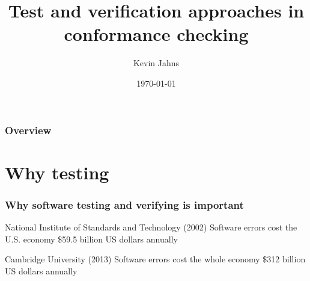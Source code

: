 \documentclass{beamer}
\title[MBT]{Test and verification approaches in conformance checking} %
\author{Kevin Jahns} %
\institute[] %
{
RWTH Aachen University \\ %
\medskip
\textit{kevin.jahns@rwth-aachen.de} %
}
\date{\today} %
\begin{document}
\begin{frame}
\titlepage %
\end{frame}

\begin{frame}
\frametitle{Overview} %
\tableofcontents %
\end{frame}


\section{Why testing}
\begin{frame}
\frametitle{Why software testing and verifying is important}
\begin{block}{National Institute of Standards and Technology (2002)}
Software errors cost the U.S. economy \$59.5 billion US dollars
annually \cite{nist}
\end{block}
\begin{block}{Cambridge University (2013)}
Software errors cost the whole economy \$312 billion US dollars
annually \cite{cambridge_errors}
\end{block}
\end{frame}
\end{document}

